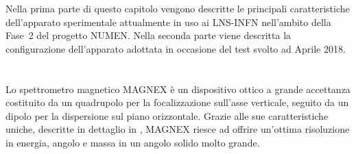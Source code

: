 

Nella prima parte di questo capitolo vengono descritte le principali caratteristiche dell'apparato sperimentale attualmente in uso ai LNS-INFN nell'ambito della Fase~2 del progetto NUMEN.
Nella seconda parte viene descritta la configurazione dell'apparato adottata in occasione del test svolto ad Aprile 2018.



\section{}

Lo spettrometro magnetico MAGNEX è un dispositivo ottico a grande accettanza costituito da un quadrupolo per la focalizzazione sull'asse verticale, seguito da un dipolo per la dispersione sul piano orizzontale.
Grazie alle sue caratteristiche uniche, descritte in dettaglio in \cite{cappuzzello:epja16,cunsolo:epjst07}, MAGNEX riesce ad offrire un'ottima risoluzione in energia, angolo e massa in un angolo solido molto grande.





\clearpage 

\subsection{}

